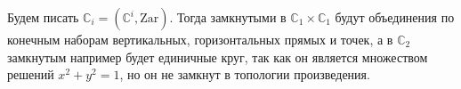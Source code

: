 \documentclass{article}
\begin{document}
\begin{enumerate}
        Будем писать $\mathbb{C}_i=(\mathbb{C}^i, \text{Zar})$. Тогда замкнутыми
        в $\mathbb{C}_1\times\mathbb{C}_1$ будут объединения по конечным наборам
        вертикальных, горизонтальных прямых и точек, а в $\mathbb{C}_2$
        замкнутым например будет единичные круг, так как он является множеством
        решений $x^2+y^2=1$, но он не замкнут в топологии произведения.
\end{enumerate}
\end{document}
